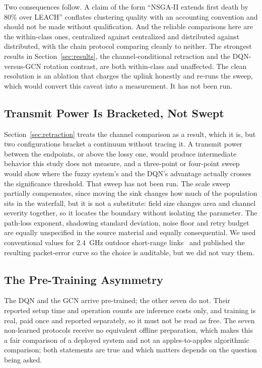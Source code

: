 Two consequences follow. A claim of the form ``NSGA-II extends first death by
80\% over LEACH'' conflates clustering quality with an accounting convention and
should not be made without qualification. And the reliable comparisons here are
the within-class ones, centralized against centralized and distributed against
distributed, with the chain protocol comparing cleanly to neither. The strongest
results in Section~\ref{sec:results}, the channel-conditional retraction and the
DQN-versus-GCN rotation contrast, are both within-class and unaffected. The
clean resolution is an ablation that charges the uplink honestly and re-runs the
sweep, which would convert this caveat into a measurement. It has not been run.

\subsection{Transmit Power Is Bracketed, Not Swept}

Section~\ref{sec:retraction} treats the channel comparison as a result, which it
is, but two configurations bracket a continuum without tracing it. A transmit
power between the endpoints, or above the lossy one, would produce intermediate
behavior this study does not measure, and a three-point or four-point sweep
would show where the fuzzy system's and the DQN's advantage actually crosses the
significance threshold. That sweep has not been run. The scale sweep partially
compensates, since moving the sink changes how much of the population sits in
the waterfall, but it is not a substitute: field size changes area and channel
severity together, so it locates the boundary without isolating the parameter.
The path-loss exponent, shadowing standard deviation, noise floor and retry
budget are equally unspecified in the source material and equally consequential.
We used conventional values for 2.4~GHz outdoor short-range
links~\cite{rappaport2002wireless,ieee802154} and published the resulting
packet-error curve so the choice is auditable, but we did not vary them.

\subsection{The Pre-Training Asymmetry}

The DQN and the GCN arrive pre-trained; the other seven do not. Their reported
setup time and operation counts are inference costs only, and training is real,
paid once and reported separately, so it must not be read as free. The seven
non-learned protocols receive no equivalent offline preparation, which makes
this a fair comparison of a deployed system and not an apples-to-apples
algorithmic comparison; both statements are true and which matters depends on
the question being asked.


